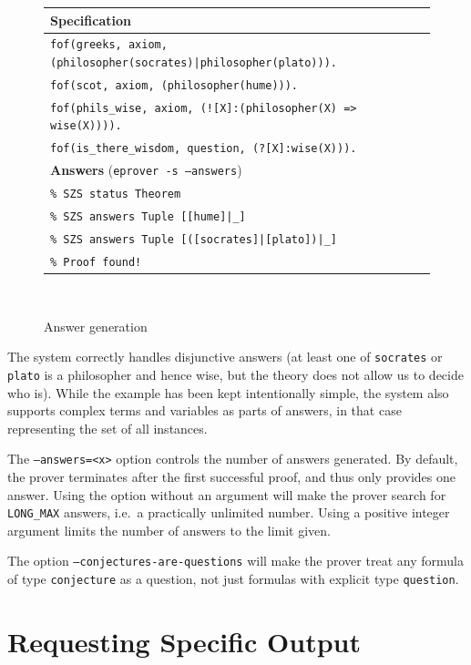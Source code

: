 \documentclass{report}
\begin{document}
\begin{figure}
  \centering
\begin{tabular}{p{}}
  \hline
  \textbf{Specification}\\
  \hline
  \verb+fof(greeks, axiom, (philosopher(socrates)|philosopher(plato))).+\\
  \verb|fof(scot, axiom, (philosopher(hume))).|\\
  \verb|fof(phils_wise, axiom, (![X]:(philosopher(X) => wise(X)))).|\\
  \verb|fof(is_there_wisdom, question, (?[X]:wise(X))).|\\
  \hline
  \textbf{Answers} (\texttt{eprover -s --answers})\\
  \hline
  \verb|% SZS status Theorem|\\
  \verb+% SZS answers Tuple [[hume]|_]+\\
  \verb+% SZS answers Tuple [([socrates]|[plato])|_]+\\
  \verb|% Proof found!|\\
  \hline
\end{tabular}\\

  \caption{Answer generation}
  \label{fig:answers}
\end{figure}

The system correctly handles disjunctive answers (at least one of
\texttt{socrates} or \texttt{plato} is a philosopher and hence wise,
but the theory does not allow us to decide who is). While the example
has been kept intentionally simple, the system also supports complex
terms and variables as parts of answers, in that case representing the
set of all instances.

The \texttt{--answers=<x>} option controls the number of answers
generated. By default, the prover terminates after the first
successful proof, and thus only provides one answer. Using the option
without an argument will make the prover search for \texttt{LONG\_MAX}
answers, i.e.\ a practically unlimited number. Using a positive integer
argument limits the number of answers to the limit given.

The option \texttt{--conjectures-are-questions} will make the prover
treat any formula of type \texttt{conjecture} as a question, not just
formulas with explicit type \texttt{question}.




\section{Requesting Specific Output}
\label{sec:output:results}
\end{document}
